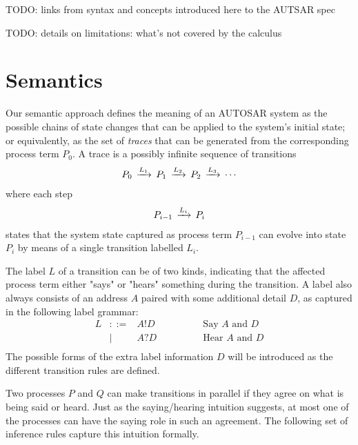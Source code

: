 \documentclass[twocolumn]{article}
\begin{document}
TODO: links from syntax and concepts introduced here to the AUTSAR spec

TODO: details on limitations: what's not covered by the calculus

\section{Semantics}
\label{sec:Sem}

Our semantic approach defines the meaning of an AUTOSAR system as the possible chains of state changes that can be applied to the system's initial state; or equivalently, as the set of \emph{traces} that can be generated from the corresponding process term $P_0$. A trace is a possibly infinite sequence of transitions
\[
\begin{array}{c}
	P_0 \,\xrightarrow{L_1}\, P_1 \,\xrightarrow{L_2}\, P_2 \,\xrightarrow{L_3}\, \cdots
\end{array}
\]
where each step
\[
\begin{array}{c}
	P_{i-1} \,\xrightarrow{L_i}\, P_i
\end{array}
\]
states that the system state captured as process term $P_{i-1}$ can evolve into state $P_i$ by means of a single transition labelled $L_i$.


The label $L$ of a transition can be of two kinds, indicating that the affected process term either "says" or "hears" something during the transition. A label also always consists of an address $A$ paired with some additional detail $D$, as captured in the following label grammar:
\[
\begin{array}{rcll}
	L	& ::=		& A!D		& \hspace{4em}\text{Say $A$ and $D$} \\
		&	|	& A?D		& \hspace{4em}\text{Hear $A$ and $D$} \\
\end{array}
\]
The possible forms of the extra label information $D$ will be introduced as the different transition rules are defined.

Two processes $P$ and $Q$ can make transitions in parallel if they agree on what is being said or heard. Just as the saying/hearing intuition suggests, at most one of the processes can have the saying role in such an agreement. The following set of inference rules capture this intuition formally.
\end{document}
